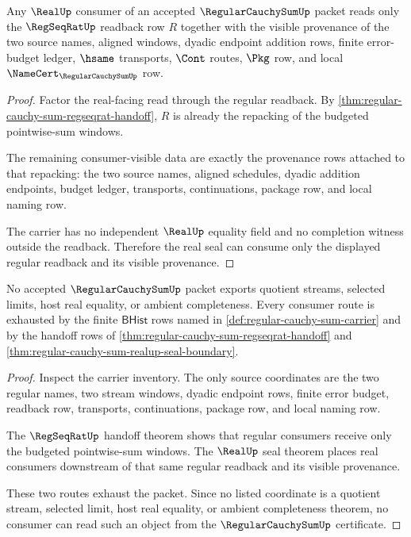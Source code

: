 \begin{theorem}
\label{thm:regular-cauchy-sum-realup-seal-boundary}
Any $\RealUp$ consumer of an accepted $\RegularCauchySumUp$ packet reads only the $\RegSeqRatUp$ readback row $R$ together with the visible provenance of the two source names, aligned windows, dyadic endpoint addition rows, finite error-budget ledger, $\hsame$ transports, $\Cont$ routes, $\Pkg$ row, and local $\NameCert_{\RegularCauchySumUp}$ row.
\end{theorem}
\begin{proof}
Factor the real-facing read through the regular readback. By \autoref{thm:regular-cauchy-sum-regseqrat-handoff}, $R$ is already the repacking of the budgeted pointwise-sum windows.

The remaining consumer-visible data are exactly the provenance rows attached to that repacking: the two source names, aligned schedules, dyadic addition endpoints, budget ledger, transports, continuations, package row, and local naming row.

The carrier has no independent $\RealUp$ equality field and no completion witness outside the readback. Therefore the real seal can consume only the displayed regular readback and its visible provenance.
\end{proof}

\begin{theorem}
\label{thm:regular-cauchy-sum-non-escape-boundary}
No accepted $\RegularCauchySumUp$ packet exports quotient streams, selected limits, host real equality, or ambient completeness. Every consumer route is exhausted by the finite $\mathsf{BHist}$ rows named in \autoref{def:regular-cauchy-sum-carrier} and by the handoff rows of \autoref{thm:regular-cauchy-sum-regseqrat-handoff} and \autoref{thm:regular-cauchy-sum-realup-seal-boundary}.
\end{theorem}
\begin{proof}
Inspect the carrier inventory. The only source coordinates are the two regular names, two stream windows, dyadic endpoint rows, finite error budget, readback row, transports, continuations, package row, and local naming row.

The $\RegSeqRatUp$ handoff theorem shows that regular consumers receive only the budgeted pointwise-sum windows. The $\RealUp$ seal theorem places real consumers downstream of that same regular readback and its visible provenance.

These two routes exhaust the packet. Since no listed coordinate is a quotient stream, selected limit, host real equality, or ambient completeness theorem, no consumer can read such an object from the $\RegularCauchySumUp$ certificate.
\end{proof}

